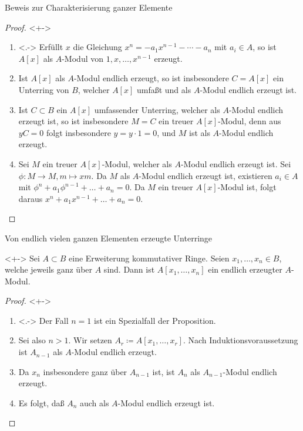 \begin{frame}{Beweis zur Charakterisierung ganzer Elemente}
	\begin{proof}<+->
		\begin{enumerate}[<+->]
		\item<.->
			Erfüllt \(x\) die Gleichung \(x^n = - a_1 x^{n - 1} - \dotsb - 
			a_n\) mit \(a_i \in A\), so ist \(A[x]\) als \(A\)-Modul von
			\(1, x, \dotsc, x^{n - 1}\) erzeugt.
		\item
			Ist \(A[x]\) als \(A\)-Modul endlich erzeugt, so ist insbesondere
			\(C = A[x]\) ein Unterring von \(B\), welcher \(A[x]\)
			umfaßt und als \(A\)-Modul endlich erzeugt ist.
		\item
			Ist \(C \subset B\) ein \(A[x]\) umfassender Unterring, welcher
			als \(A\)-Modul endlich erzeugt ist, so ist insbesondere \(M = C\)
			ein treuer \(A[x]\)-Modul, denn aus \(y C = 0\) folgt
			insbesondere \(y = y \cdot 1 = 0\), und \(M\) ist als \(A\)-Modul
			endlich erzeugt.
		\item
			Sei \(M\) ein treuer \(A[x]\)-Modul, welcher als \(A\)-Modul
			endlich erzeugt ist. Sei \(\phi\colon M \to M, m \mapsto x m\).
			Da \(M\) als \(A\)-Modul endlich erzeugt ist, existieren
			\(a_i \in A\) mit \(\phi^n + a_1 \phi^{n -1} + \dotsc + a_n = 0\).
			Da \(M\) ein treuer \(A[x]\)-Modul ist, folgt daraus
			\(x^n + a_1 x^{n - 1} + \dotsc + a_n = 0\).
			\qedhere
		\end{enumerate}
	\end{proof}
\end{frame}

\begin{frame}{Von endlich vielen ganzen Elementen erzeugte Unterringe}
	\begin{corollary}<+->
		Sei \(A \subset B\) eine Erweiterung kommutativer Ringe. Seien
		\(x_1, \dotsc, x_n \in B\), welche jeweils ganz über \(A\) sind. Dann
		ist \(A[x_1, \dotsc, x_n]\) ein endlich erzeugter \(A\)-Modul.
	\end{corollary}
	\begin{proof}<+->
		\begin{enumerate}[<+->]
		\item<.->
			Der Fall \(n = 1\) ist ein Spezialfall der Proposition.
		\item
			Sei also \(n > 1\). Wir setzen
			\(A_r \coloneqq A[x_1, \dotsc, x_r]\). Nach Induktionsvoraussetzung
			ist \(A_{n - 1}\) als \(A\)-Modul endlich erzeugt.
		\item
			Da \(x_n\) insbesondere ganz über \(A_{n - 1}\) ist, ist
			\(A_n\) als \(A_{n - 1}\)-Modul endlich erzeugt.
		\item
			Es folgt, daß \(A_n\) auch als \(A\)-Modul endlich erzeugt ist.
			\qedhere
		\end{enumerate}
	\end{proof}
\end{frame}

